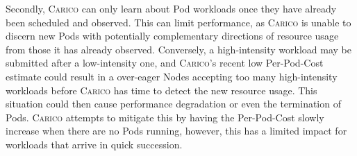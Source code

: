 Secondly, \textsc{Carico} can only learn about Pod workloads once they have
already been scheduled and observed. This can limit performance, as
\textsc{Carico} is unable to discern new Pods with potentially complementary directions
of resource usage from those it has already observed. Conversely, a
high-intensity workload may be submitted after a low-intensity one, and
\textsc{Carico}'s recent low Per-Pod-Cost estimate could result in a over-eager
Nodes accepting too many high-intensity workloads before \textsc{Carico} has
time to detect the new resource usage. This situation could then cause
performance degradation or even the termination of Pods. \textsc{Carico}
attempts to mitigate this by having the Per-Pod-Cost slowly increase when there
are no Pods running, however, this has a limited impact for workloads that
arrive in quick succession.
